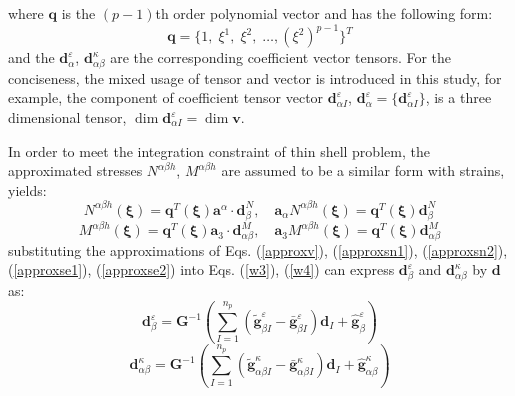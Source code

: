 where $\boldsymbol q$ is the $(p-1)$th order polynomial vector and has the following form:
\begin{equation}
\boldsymbol q = \{ 1,\; \xi^1,\; \xi^2,\; \dots, (\xi^2)^{p-1}\}^T
\end{equation}
and the $\boldsymbol d^\varepsilon_{\alpha}$, $\boldsymbol d^\kappa_{\alpha\beta}$ are the corresponding coefficient vector tensors. For the conciseness, the mixed usage of tensor and vector is introduced in this study, for example, the component of coefficient tensor vector $\boldsymbol d^\varepsilon_{\alpha I}$, $\boldsymbol d^\varepsilon_\alpha = \{\boldsymbol d^\varepsilon_{\alpha I}\}$, is a three dimensional tensor, $\dim \boldsymbol d^\varepsilon_{\alpha I} = \dim \boldsymbol v$.

In order to meet the integration constraint of thin shell problem, the approximated stresses $N^{\alpha\beta h}$, $M^{\alpha\beta h}$ are assumed to be a similar form with strains, yields:
\begin{equation}\label{approxse1}
N^{\alpha\beta h}(\boldsymbol \xi) = \boldsymbol q^T(\boldsymbol \xi) \boldsymbol a^\alpha \cdot \boldsymbol d_{\beta}^N,\quad
\boldsymbol a_\alpha N^{\alpha\beta h}(\boldsymbol \xi) = \boldsymbol q^T(\boldsymbol \xi) \boldsymbol d^N_\beta
\end{equation}
\begin{equation}\label{approxse2}
    M^{\alpha\beta h}(\boldsymbol \xi) = \boldsymbol q^T(\boldsymbol \xi) \boldsymbol a_3 \cdot \boldsymbol d_{\alpha\beta}^M,\quad
    \boldsymbol a_3 M^{\alpha\beta h}(\boldsymbol \xi) = \boldsymbol q^T(\boldsymbol \xi) \boldsymbol d_{\alpha\beta}^M
\end{equation}
substituting the approximations of Eqs. (\ref{approxv}), (\ref{approxsn1}), (\ref{approxsn2}), (\ref{approxse1}), (\ref{approxse2}) into Eqs. (\ref{w3}), (\ref{w4}) can express $\boldsymbol d^\varepsilon_\beta$ and $\boldsymbol d^\kappa_{\alpha\beta}$ by $\boldsymbol d$ as:
\begin{equation}
\boldsymbol d^\varepsilon_\beta = \boldsymbol G^{-1} \left (\sum_{I=1}^{n_p}(\tilde{\boldsymbol g}^\varepsilon_{\beta I} - \bar{\boldsymbol g}^\varepsilon_{\beta I}) \boldsymbol d_I + \hat{\boldsymbol g}^\varepsilon_\beta \right )
\end{equation}
\begin{equation}
\boldsymbol d^\kappa_{\alpha\beta} = \boldsymbol G^{-1} \left (\sum_{I=1}^{n_p}(\tilde{\boldsymbol g}^\kappa_{\alpha\beta I} - \bar{\boldsymbol g}^\kappa_{\alpha\beta I})\boldsymbol d_I + \hat{\boldsymbol g}^\kappa_{\alpha\beta} \right )
\end{equation}

